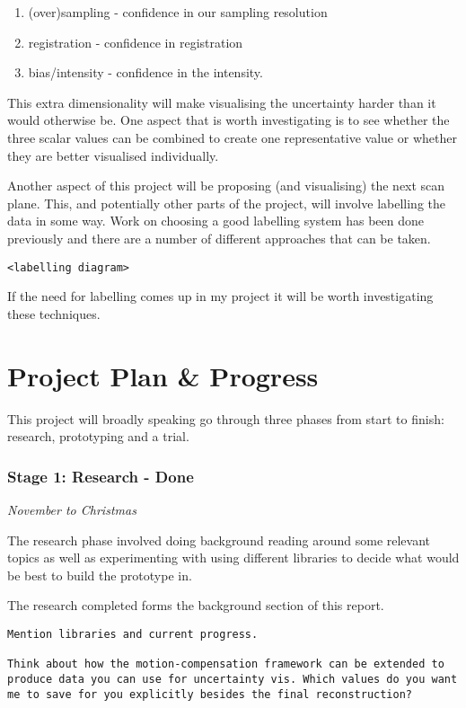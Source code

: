 \documentclass[
  oneside,
  11pt, a4paper,
  footinclude=true,
  headinclude=true,
  cleardoublepage=empty
]{scrbook}
\begin{document}
\begin{enumerate}
	\item (over)sampling - confidence in our sampling resolution
	\item registration - confidence in registration
	\item bias/intensity - confidence in the intensity.
\end{enumerate}

This extra dimensionality will make visualising the uncertainty harder than it would otherwise be. One aspect that is worth investigating is to see whether the three scalar values can be combined to create one representative value or whether they are better visualised individually.

Another aspect of this project will be proposing (and visualising) the next scan plane. This, and potentially other parts of the project, will involve labelling the data in some way. Work on choosing a good labelling system has been done previously and there are a number of different approaches that can be taken\cite{labelling}.

\begin{verbatim}
<labelling diagram>
\end{verbatim}

If the need for labelling comes up in my project it will be worth investigating these techniques.

\chapter{Project Plan \& Progress}
This project will broadly speaking go through three phases from start to finish: research, prototyping and a trial.

\subsection*{Stage 1: Research - Done}
\textit{November to Christmas}

The research phase involved doing background reading around some relevant topics as well as experimenting with using different libraries to decide what would be best to build the prototype in.

The research completed forms the background section of this report.

\begin{verbatim}
Mention libraries and current progress.

Think about how the motion-compensation framework can be extended to produce data you can use for uncertainty vis. Which values do you want me to save for you explicitly besides the final reconstruction?
\end{verbatim}
\end{document}
